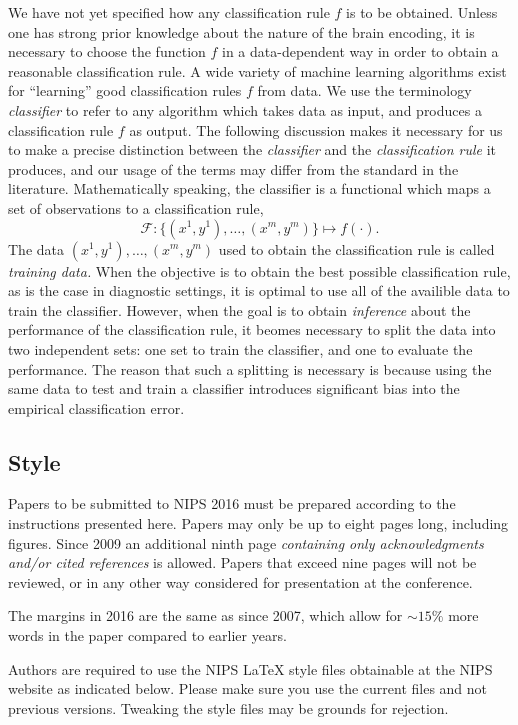 \documentclass{article}
\begin{document}
We have not yet specified how any classification rule $f$ is to be
obtained.  Unless one has strong prior knowledge about the nature of
the brain encoding, it is necessary to choose the function $f$ in a
data-dependent way in order to obtain a reasonable classification
rule.  A wide variety of machine learning algorithms exist for
``learning'' good classification rules $f$ from data.  We use the
terminology \emph{classifier} to refer to any algorithm which takes
data as input, and produces a classification rule $f$ as output.  The
following discussion makes it necessary for us to make a precise
distinction between the \emph{classifier} and the \emph{classification
rule} it produces, and our usage of the terms may differ from the
standard in the literature.  Mathematically speaking, the classifier
is a functional which maps a set of observations to a classification
rule,
\[
\mathcal{F}: \{(x^{1},y^{1}),\hdots, (x^{m}, y^{m})\} \mapsto f(\cdot).
\]
The data $(x^1,y^1),\hdots, (x^m, y^m)$ used to obtain the
classification rule is called \emph{training data.}  When the
objective is to obtain the best possible classification rule, as is
the case in diagnostic settings, it is optimal to use all of the
availible data to train the classifier.  However, when the goal is to
obtain \emph{inference} about the performance of the classification
rule, it beomes necessary to split the data into two independent sets:
one set to train the classifier, and one to evaluate the performance.
The reason that such a splitting is necessary is because using the
same data to test and train a classifier introduces significant bias
into the empirical classification error.


\subsection{Style}

Papers to be submitted to NIPS 2016 must be prepared according to the
instructions presented here. Papers may only be up to eight pages
long, including figures. Since 2009 an additional ninth page
\emph{containing only acknowledgments and/or cited references} is
allowed. Papers that exceed nine pages will not be reviewed, or in any
other way considered for presentation at the conference.

The margins in 2016 are the same as since 2007, which allow for
$\sim$$15\%$ more words in the paper compared to earlier years.

Authors are required to use the NIPS \LaTeX{} style files obtainable
at the NIPS website as indicated below. Please make sure you use the
current files and not previous versions. Tweaking the style files may
be grounds for rejection.
\end{document}
